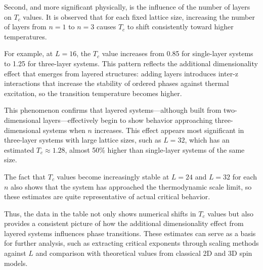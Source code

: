 Second, and more significant physically, is the influence of the number of layers on $T_c$ values. It is observed that for each fixed lattice size, increasing the number of layers from $n = 1$ to $n = 3$ causes $T_c$ to shift consistently toward higher temperatures.

For example, at $L = 16$, the $T_c$ value increases from 0.85 for single-layer systems to 1.25 for three-layer systems. This pattern reflects the additional dimensionality effect that emerges from layered structures: adding layers introduces inter-z interactions that increase the stability of ordered phases against thermal excitation, so the transition temperature becomes higher.

This phenomenon confirms that layered systems—although built from two-dimensional layers—effectively begin to show behavior approaching three-dimensional systems when $n$ increases. This effect appears most significant in three-layer systems with large lattice sizes, such as $L = 32$, which has an estimated $T_c \approx 1.28$, almost 50\% higher than single-layer systems of the same size.

The fact that $T_c$ values become increasingly stable at $L = 24$ and $L = 32$ for each $n$ also shows that the system has approached the thermodynamic scale limit, so these estimates are quite representative of actual critical behavior.

Thus, the data in the table not only shows numerical shifts in $T_c$ values but also provides a consistent picture of how the additional dimensionality effect from layered systems influences phase transitions. These estimates can serve as a basis for further analysis, such as extracting critical exponents through scaling methods against $L$ and comparison with theoretical values from classical 2D and 3D spin models. 